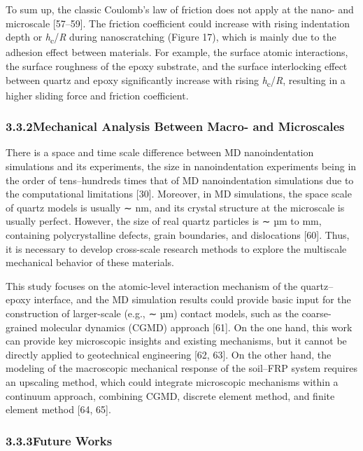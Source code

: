 \documentclass{article}
\begin{document}
To sum up, the classic Coulomb’s law of friction does not apply at the nano- and microscale [57–59]. The friction coefficient could increase with rising indentation depth or \emph{h}\textsubscript{c}/\emph{R} during nanoscratching (Figure 17), which is mainly due to the adhesion effect between materials. For example, the surface atomic interactions, the surface roughness of the epoxy substrate, and the surface interlocking effect between quartz and epoxy significantly increase with rising \emph{h}\textsubscript{c}/\emph{R}, resulting in a higher sliding force and friction coefficient.

\subsubsection*{3.3.2\quad Mechanical Analysis Between Macro- and Microscales}

There is a space and time scale difference between MD nanoindentation simulations and its experiments, the size in nanoindentation experiments being in the order of tens–hundreds times that of MD nanoindentation simulations due to the computational limitations [30]. Moreover, in MD simulations, the space scale of quartz models is usually ∼ nm, and its crystal structure at the microscale is usually perfect. However, the size of real quartz particles is ∼ µm to mm, containing polycrystalline defects, grain boundaries, and dislocations [60]. Thus, it is necessary to develop cross-scale research methods to explore the multiscale mechanical behavior of these materials.

This study focuses on the atomic-level interaction mechanism of the quartz–epoxy interface, and the MD simulation results could provide basic input for the construction of larger-scale (e.g., ∼ µm) contact models, such as the coarse-grained molecular dynamics (CGMD) approach [61]. On the one hand, this work can provide key microscopic insights and existing mechanisms, but it cannot be directly applied to geotechnical engineering [62, 63]. On the other hand, the modeling of the macroscopic mechanical response of the soil–FRP system requires an upscaling method, which could integrate microscopic mechanisms within a continuum approach, combining CGMD, discrete element method, and finite element method [64, 65].

\subsubsection*{3.3.3\quad Future Works}
\end{document}
